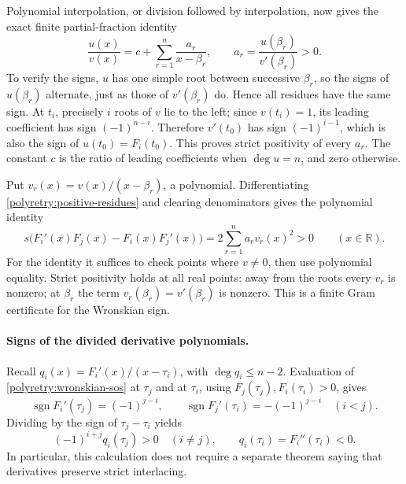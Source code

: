 \documentclass[11pt]{article}
\newcommand{\R}{\mathbb R}
\theoremstyle{remark}
\numberwithin{equation}{section}
\begin{document}
Polynomial interpolation, or division followed by interpolation,
now gives the exact finite partial-fraction identity
\begin{equation}\label{polyretry:positive-residues}
 \frac{u(x)}{v(x)}
   =c+\sum_{r=1}^n\frac{a_r}{x-\beta_r},
 \qquad a_r=\frac{u(\beta_r)}{v'(\beta_r)}>0.
\end{equation}
To verify the signs, $u$ has one simple root between successive
$\beta_r$, so the signs of $u(\beta_r)$ alternate, just as those
of $v'(\beta_r)$ do.  Hence all residues have the same sign.
At $t_i$, precisely $i$ roots of $v$ lie to the left; since
$v(t_i)=1$, its leading coefficient has sign $(-1)^{n-i}$.
Therefore $v'(t_0)$ has sign $(-1)^{i-1}$, which is also the
sign of $u(t_0)=F_i(t_0)$.  This proves strict positivity of
every $a_r$.  The constant $c$ is the ratio of leading
coefficients when $\deg u=n$, and zero otherwise.

Put $v_r(x)=v(x)/(x-\beta_r)$, a polynomial.  Differentiating
\eqref{polyretry:positive-residues} and clearing denominators
gives the polynomial identity
\begin{equation}\label{polyretry:wronskian-sos}
 s\bigl(F_i'(x)F_j(x)-F_i(x)F_j'(x)\bigr)
       =2\sum_{r=1}^n a_r v_r(x)^2>0
       \qquad(x\in\R).
\end{equation}
For the identity it suffices to check points where $v\ne0$,
then use polynomial equality.  Strict positivity holds at all
real points: away from the roots every $v_r$ is nonzero; at
$\beta_r$ the term $v_r(\beta_r)=v'(\beta_r)$ is nonzero.
This is a finite Gram certificate for the Wronskian sign.

\paragraph{Signs of the divided derivative polynomials.}
Recall $q_i(x)=F_i'(x)/(x-\tau_i)$, with $\deg q_i\le n-2$.
Evaluation of \eqref{polyretry:wronskian-sos} at $\tau_j$
and at $\tau_i$, using $F_j(\tau_j),F_i(\tau_i)>0$, gives
\[
 \operatorname{sgn}F_i'(\tau_j)=(-1)^{j-i},\qquad
 \operatorname{sgn}F_j'(\tau_i)=-(-1)^{j-i}
       \quad(i<j).
\]
Dividing by the sign of $\tau_j-\tau_i$ yields
\begin{equation}\label{polyretry:q-signs}
 (-1)^{i+j}q_i(\tau_j)>0\quad(i\ne j),
 \qquad q_i(\tau_i)=F_i''(\tau_i)<0.
\end{equation}
In particular, this calculation does not require a separate
theorem saying that derivatives preserve strict interlacing.
\end{document}
